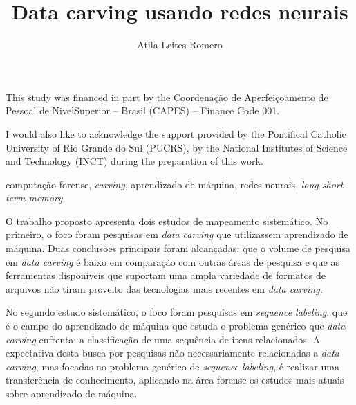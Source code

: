\documentclass[english,oneside]{pucrs-ppgcc}
\author{Atila Leites Romero}
\title{Data carving usando redes neurais}
      {Data carving using neural networks}
\begin{document}
%


\begin{agradecimentos}
This study was financed in part by the Coordenação de Aperfeiçoamento de Pessoal de NivelSuperior – Brasil (CAPES) – Finance Code 001.

I would also like to acknowledge the support provided by the Pontifical Catholic University of Rio Grande do Sul (PUCRS), by the National Institutes of Science and Technology (INCT)
during the preparation of this work.

\end{agradecimentos}

\begin{resumo}{computação forense, \textit{carving}, aprendizado de máquina, redes neurais, \textit{long short-term memory}}

O trabalho proposto apresenta dois estudos de mapeamento sistemático.
No primeiro, o foco foram pesquisas em \textit{data carving} que utilizassem aprendizado de máquina. Duas conclusões principais foram alcançadas: que o volume de pesquisa em \textit{data carving} é baixo em comparação com outras áreas de pesquisa e que as ferramentas disponíveis que suportam uma ampla variedade de formatos de arquivos não tiram proveito das tecnologias mais recentes em \textit{data carving}.

No segundo estudo sistemático, o foco foram pesquisas em \textit{sequence labeling}, que é o campo do aprendizado de máquina que estuda o problema genérico que \textit{data carving} enfrenta: a classificação de uma sequência de itens relacionados. A expectativa desta busca por pesquisas não necessariamente relacionadas a \textit{data carving}, mas focadas no problema genérico de \textit{sequence labeling}, é realizar uma transferência de conhecimento, aplicando na área forense os estudos mais atuais sobre aprendizado de máquina. 

\end{resumo}
\end{document}
